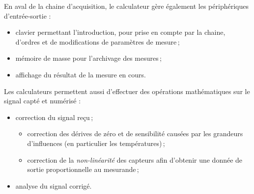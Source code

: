 En aval de la chaine d'acquisition, le calculateur gère également les périphériques d'entrée-sortie :
\begin{itemize}
\item clavier permettant l'introduction, pour prise en compte par la chaine, d'ordres et de modifications de paramètres de mesure\,;
\item mémoire de masse pour l'archivage des mesures\,;
\item affichage du résultat de la mesure en cours.
\end{itemize}

Les calculateurs permettent aussi d'effectuer des opérations mathématiques sur le signal capté et numérisé :
\begin{itemize}
\item correction du signal reçu\,;
	\begin{itemize}
	\item correction des dérives de zéro et de sensibilité causées par les grandeurs d'influences (en particulier les températures)\,;
	\item correction de la \emph{non-linéarité} des capteurs afin d'obtenir une donnée de sortie proportionnelle au mesurande\,;
	\end{itemize}
\item analyse du signal corrigé.
\end{itemize}



%

